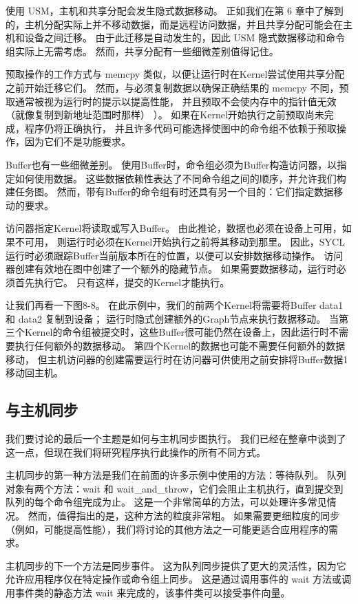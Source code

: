 使用 USM，主机和共享分配会发生隐式数据移动。 
正如我们在第 6 章中了解到的，主机分配实际上并不移动数据，而是远程访问数据，并且共享分配可能会在主机和设备之间迁移。 
由于此迁移是自动发生的，因此 USM 隐式数据移动和命令组实际上无需考虑。 
然而，共享分配有一些细微差别值得记住。

预取操作的工作方式与 memcpy 类似，以便让运行时在Kernel尝试使用共享分配之前开始迁移它们。 
然而，与必须复制数据以确保正确结果的 memcpy 不同，预取通常被视为运行时的提示以提高性能，
并且预取不会使内存中的指针值无效（就像复制到新地址范围时那样） ）。 
如果在Kernel开始执行之前预取尚未完成，程序仍将正确执行，
并且许多代码可能选择使图中的命令组不依赖于预取操作，因为它们不是功能要求。

Buffer也有一些细微差别。 使用Buffer时，命令组必须为Buffer构造访问器，以指定如何使用数据。 
这些数据依赖性表达了不同命令组之间的顺序，并允许我们构建任务图。 
然而，带有Buffer的命令组有时还具有另一个目的：它们指定数据移动的要求。

访问器指定Kernel将读取或写入Buffer。 由此推论，数据也必须在设备上可用，如果不可用，
则运行时必须在Kernel开始执行之前将其移动到那里。 
因此，SYCL 运行时必须跟踪Buffer当前版本所在的位置，以便可以安排数据移动操作。 
访问器创建有效地在图中创建了一个额外的隐藏节点。 如果需要数据移动，运行时必须首先执行它。 
只有这样，提交的Kernel才能执行。

让我们再看一下图8-8。 在此示例中，我们的前两个Kernel将需要将Buffer data1 和 data2 复制到设备； 
运行时隐式创建额外的Graph节点来执行数据移动。 
当第三个Kernel的命令组被提交时，这些Buffer很可能仍然在设备上，因此运行时不需要执行任何额外的数据移动。 
第四个Kernel的数据也可能不需要任何额外的数据移动，
但主机访问器的创建需要运行时在访问器可供使用之前安排将Buffer数据1移动回主机。

\subsection{与主机同步}
我们要讨论的最后一个主题是如何与主机同步图执行。 
我们已经在整章中谈到了这一点，但现在我们将研究程序执行此操作的所有不同方式。

主机同步的第一种方法是我们在前面的许多示例中使用的方法：等待队列。 
队列对象有两个方法：wait 和 wait\_and\_throw，它们会阻止主机执行，直到提交到队列的每个命令组完成为止。 
这是一个非常简单的方法，可以处理许多常见情况。 然而，值得指出的是，这种方法的粒度非常粗。 
如果需要更细粒度的同步（例如，可能提高性能），我们将讨论的其他方法之一可能更适合应用程序的需求。

主机同步的下一个方法是同步事件。 这为队列同步提供了更大的灵活性，因为它允许应用程序仅在特定操作或命令组上同步。 
这是通过调用事件的 wait 方法或调用事件类的静态方法 wait 来完成的，该事件类可以接受事件向量。

